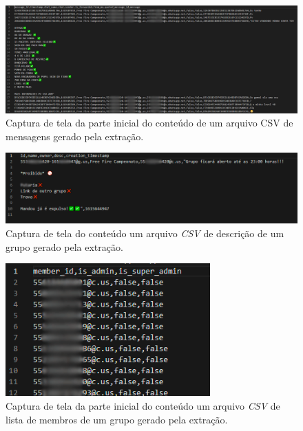 \begin{figure}[!htb]
    \centering
    \includegraphics[width=1\textwidth]{img/csv_msgs.png}
    \caption{Captura de tela da parte inicial do conteúdo de um arquivo CSV de mensagens gerado pela extração.}
    \label{fig:csv-msgs}
\end{figure}

\begin{figure}[!htb]
    \centering
    \includegraphics[width=1\textwidth]{img/csv_group.png}
    \caption{Captura de tela do conteúdo um arquivo \textit{CSV} de descrição de um grupo gerado pela extração.}
    \label{fig:csv-group}
\end{figure}

\begin{figure}[!htb]
    \centering
    \includegraphics[width=0.7\textwidth]{img/csv_members.png}
    \caption{Captura de tela da parte inicial do conteúdo um arquivo \textit{CSV} de lista de membros de um grupo gerado pela extração.}
    \label{fig:csv-members}
\end{figure}


